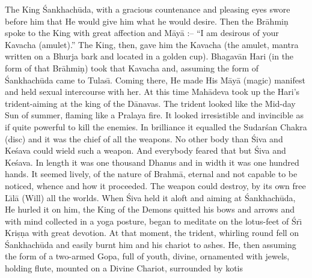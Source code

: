 The King \'Sankhach\=uda, with a gracious countenance and pleasing eyes swore before him that He would give him what he would desire. Then the Br\=ahmi\d{n} spoke to the King with great affection and M\=ay\=a :-- ``I am desirous of your Kavacha (amulet).'' The King, then, gave him the Kavacha (the amulet, mantra written on a Bhurja bark and located in a golden cup). Bhagav\=an Hari (in the form of that Br\=ahmi\d{n}) took that Kavacha and, assuming the form of \'Sankhach\=uda came to Tulas\={\i}. Coming there, He made His M\=ay\=a (magic) manifest and held sexual intercourse with her. At this time Mah\=adeva took up the Hari's trident-aiming at the king of the D\=anavas. The trident looked like the Mid-day Sun of summer, flaming like a Pralaya fire. It looked irresistible and invincible as if quite powerful to kill the enemies. In brilliance it equalled the Sudar\'san Chakra (disc) and it was the chief of all the weapons. No other body than \'Siva and Ke\'sava could wield such a weapon. And everybody feared that but \'Siva and Ke\'sava. In length it was one thousand Dhanus and in width it was one hundred hands. It seemed lively, of the nature of Brahm\=a, eternal and not capable to be noticed, whence and how it proceeded. The weapon could destroy, by its own free L\={\i}l\=a (Will) all the worlds. When \'Siva held it aloft and aiming at \'Sankhach\=uda, He hurled it on him, the King of the Demons quitted his bows and arrows and with mind collected in a yoga posture, began to meditate on the lotus-feet of \'Sr\={\i} Kri\d{s}\d{n}a with great devotion. At that moment, the trident, whirling round fell on \'Sankhach\=uda and easily burnt him and his chariot to ashes. He, then assuming the form of a two-armed Gopa, full of youth, divine, ornamented with jewels, holding flute, mounted on a Divine Chariot, surrounded by kotis


